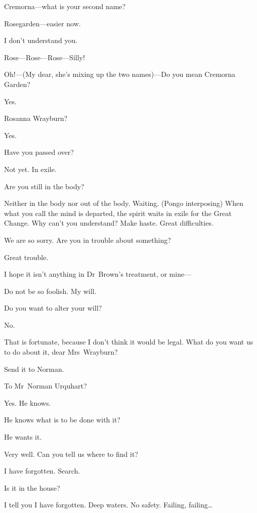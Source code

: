 \begin{dialogue}
 Cremorna—what is your second name?

  Rosegarden—easier now.

 I don't understand you.

 Rose—Rose—Rose—Silly!

 Oh!—(My dear, she's mixing up the two names)—Do you mean Cremorna Garden?

 Yes.

 Rosanna Wrayburn?

 Yes.

 Have you passed over?

 Not yet. In exile.

 Are you still in the body?

 Neither in the body nor out of the body. Waiting. (Pongo interposing) When what you call the mind is departed, the spirit waits in exile for the Great Change. Why can't you understand? Make haste. Great difficulties.

 We are so sorry. Are you in trouble about something?

 Great trouble.

 I hope it isn't anything in Dr~Brown's treatment, or mine—

  Do not be so foolish.  My will.

 Do you want to alter your will?

 No.

 That is fortunate, because I don't think it would be legal. What do you want us to do about it, dear Mrs~Wrayburn?

 Send it to Norman.

 To Mr~Norman Urquhart?

 Yes. He knows.

 He knows what is to be done with it?

 He wants it.

 Very well. Can you tell us where to find it?

 I have forgotten. Search.

 Is it in the house?

 I tell you I have forgotten. Deep waters. No safety. Failing, failing\dots


\end{dialogue}
